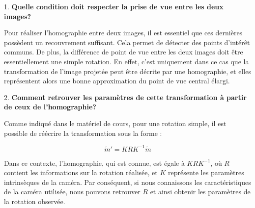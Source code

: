 \documentclass[../5RO17_TP1.tex]{subfiles}
\begin{document}
1. \textbf{Quelle condition doit respecter la prise de vue entre les deux images?}

Pour réaliser l'homographie entre deux images, il est essentiel que ces dernières possèdent un recouvrement suffisant. Cela permet de détecter des points d'intérêt communs. De plus, la différence de point de vue entre les deux images doit être essentiellement une simple rotation. En effet, c'est uniquement dans ce cas que la transformation de l'image projetée peut être décrite par une homographie, et elles représentent alors une bonne approximation du point de vue central élargi.

\medskip

2. \textbf{Comment retrouver les paramètres de cette transformation à partir de ceux de l’homographie?}

Comme indiqué dans le matériel de cours, pour une rotation simple, il est possible de réécrire la transformation sous la forme :

\[
\tilde{m}' = K R K^{-1} \tilde{m}
\]

Dans ce contexte, l'homographie, qui est connue, est égale à \( K R K^{-1} \), où \( R \) contient les informations sur la rotation réalisée, et \( K \) représente les paramètres intrinsèques de la caméra. Par conséquent, si nous connaissons les caractéristiques de la caméra utilisée, nous pouvons retrouver \( R \) et ainsi obtenir les paramètres de la rotation observée.
\end{document}
